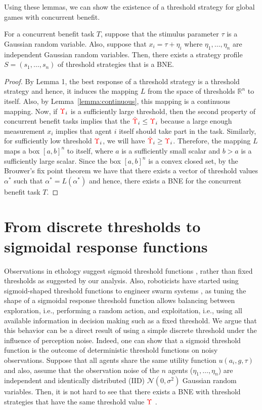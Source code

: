 \documentclass[smallextended]{svjour3}       %
\newcommand{\edit}[1]{\textcolor{red}{#1}}
\def\R{\mathbb{R}}    %
\def\td{\edit{\Upsilon}}   %
\begin{document}
Using these lemmas, we can show the existence of a threshold strategy for global games with concurrent benefit. 
\begin{theorem}\label{thrm:mainthrm}
For a concurrent benefit task $T$, suppose that the stimulus parameter $\tau$ is a Gaussian random variable. Also, suppose that $x_i=\tau+\eta_i$ where $\eta_1,\ldots,\eta_n$ are independent Gaussian random variables. Then, there exists a strategy profile $S=(s_1,\ldots,s_n)$ of threshold strategies that is a BNE.
\end{theorem}
\begin{proof}
By Lemma 1, the best response of a threshold strategy is a threshold strategy and hence, it induces the mapping $L$ from the space of thresholds $\R^n$ to itself. Also, by Lemma~\ref{lemma:continuous}, this mapping is a continuous mapping. Now, if $\td_i$ is a sufficiently large threshold, then the second property of concurrent benefit tasks implies that the $\tilde{\td}_i\leq \td_i$ because a large enough measurement $x_i$ implies that agent $i$ itself should take part in the task. Similarly, for sufficiently low threshold $\td_i$, we will have $\tilde{\td}_i\geq \td_i$. Therefore, the mapping $L$ maps a box $[a,b]^n$ to itself, where $a$ is a sufficiently small scalar and $b>a$ is a sufficiently large scalar. Since the box $[a,b]^n$ is a convex closed set, by the Brouwer's fix point theorem \citep{Border1990} we have that there exists a vector of threshold values $\alpha^*$ such that $\alpha^*=L(\alpha^*)$ and hence, there exists a BNE for the concurrent benefit task $T$.
\end{proof}

\section{From discrete thresholds to sigmoidal response functions}\label{sec:continuous}
Observations in ethology suggest sigmoid threshold functions \citep{Bonabeau1996}, rather than fixed thresholds as suggested by our analysis. Also, roboticists have started using sigmoid-shaped threshold functions to engineer swarm systems \citep{Bonabeau1996,Theraulaz1998,Krieger2000}, as tuning the shape of a sigmoidal response threshold function allows balancing between exploration, i.e., performing a random action, and exploitation, i.e., using all available information in decision making such as a fixed threshold. 
We argue that this behavior can be a direct result of using a simple discrete threshold under the influence of perception noise. Indeed, one can show that a sigmoid threshold function is the outcome of deterministic threshold functions on noisy observations. Suppose that all  agents share the same utility function $u(a_i,g,\tau)$ and also, assume that the observation noise of the $n$ agents ($\eta_1,\ldots,\eta_n$) are independent and identically distributed (IID) $\mathcal{N}(0,\sigma^2)$ Gaussian random variables. Then, it is not hard to see that there exists a BNE with threshold strategies that have the same threshold value $\td$ \citep{Morris2000}.
\end{document}
